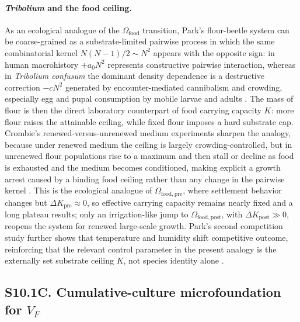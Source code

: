 \documentclass[11pt]{article}
\begin{document}
\paragraph{\textit{Tribolium} and the food ceiling.}
As an ecological analogue of the $\Omega_{\mathrm{food}}$ transition, Park's
flour-beetle system can be coarse-grained as a substrate-limited pairwise process in
which the same combinatorial kernel $N(N-1)/2\sim N^2$ appears with the opposite sign:
in human macrohistory $+a_0N^2$ represents constructive pairwise interaction, whereas
in \textit{Tribolium confusum} the dominant density dependence is a destructive correction
$-cN^2$ generated by encounter-mediated cannibalism and crowding, especially egg and
pupal consumption by mobile larvae and adults \cite{park1948,crombie1946}.
The mass of flour is then the direct laboratory counterpart of food carrying capacity
$K$: more flour raises the attainable ceiling, while fixed flour imposes a hard
substrate cap.
Crombie's renewed-versus-unrenewed medium experiments sharpen the analogy, because under
renewed medium the ceiling is largely crowding-controlled, but in unrenewed flour
populations rise to a maximum and then stall or decline as food is exhausted and the
medium becomes conditioned, making explicit a growth arrest caused by a binding food
ceiling rather than any change in the pairwise kernel \cite{crombie1946}.
This is the ecological analogue of $\Omega_{\mathrm{food,pre}}$, where settlement
behavior changes but $\Delta K_{\mathrm{pre}}\approx 0$, so effective carrying capacity
remains nearly fixed and a long plateau results; only an irrigation-like jump to
$\Omega_{\mathrm{food,post}}$, with $\Delta K_{\mathrm{post}}\gg 0$, reopens the
system for renewed large-scale growth.
Park's second competition study further shows that temperature and humidity shift
competitive outcome, reinforcing that the relevant control parameter in the present
analogy is the externally set substrate ceiling $K$, not species identity alone
\cite{park1954}.

\subsection*{S10.1C. Cumulative-culture microfoundation for $V_F$}
\end{document}
